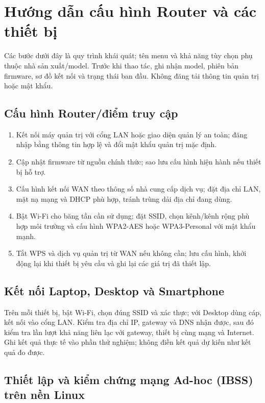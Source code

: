 \section{Hướng dẫn cấu hình Router và các thiết bị}
\label{sec:configuration-guide}

Các bước dưới đây là quy trình khái quát; tên menu và khả năng tùy chọn phụ thuộc
nhà sản xuất/model. Trước khi thao tác, ghi nhận model, phiên bản firmware, sơ đồ
kết nối và trạng thái ban đầu. Không đăng tải thông tin quản trị hoặc mật khẩu.

\subsection{Cấu hình Router/điểm truy cập}
\begin{enumerate}
  \item Kết nối máy quản trị với cổng LAN hoặc giao diện quản lý an toàn; đăng
    nhập bằng thông tin hợp lệ và đổi mật khẩu quản trị mặc định.
  \item Cập nhật firmware từ nguồn chính thức; sao lưu cấu hình hiện hành nếu
    thiết bị hỗ trợ.
  \item Cấu hình kết nối WAN theo thông số nhà cung cấp dịch vụ; đặt địa chỉ
    LAN, mặt nạ mạng và DHCP phù hợp, tránh trùng dải địa chỉ đang dùng.
  \item Bật Wi-Fi cho băng tần cần sử dụng; đặt SSID, chọn kênh/kênh rộng phù
    hợp môi trường và cấu hình WPA2-AES hoặc WPA3-Personal với mật khẩu mạnh.
  \item Tắt WPS và dịch vụ quản trị từ WAN nếu không cần; lưu cấu hình, khởi
    động lại khi thiết bị yêu cầu và ghi lại các giá trị đã thiết lập.
\end{enumerate}

\subsection{Kết nối Laptop, Desktop và Smartphone}
Trên mỗi thiết bị, bật Wi-Fi, chọn đúng SSID và xác thực; với Desktop dùng cáp,
kết nối vào cổng LAN. Kiểm tra địa chỉ IP, gateway và DNS nhận được, sau đó
kiểm tra lần lượt khả năng liên lạc với gateway, thiết bị cùng mạng và Internet.
Ghi kết quả thực tế vào phần thử nghiệm; không điền kết quả dự kiến như kết quả
đo được.

\subsection{Thiết lập và kiểm chứng mạng Ad-hoc (IBSS) trên nền Linux}
\label{sec:adhoc-config}

